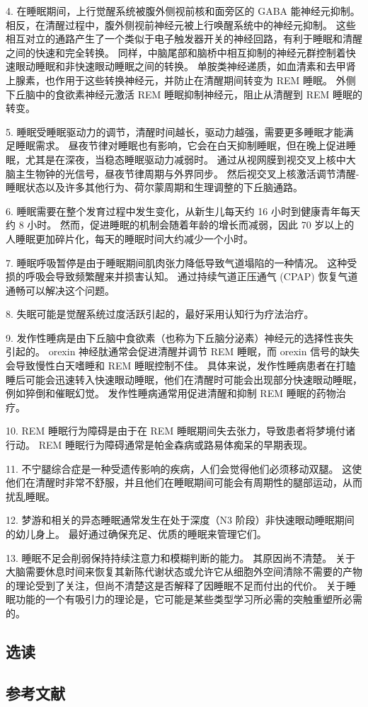 4. 在睡眠期间，上行觉醒系统被腹外侧视前核和面旁区的 GABA 能神经元抑制。 相反，在清醒过程中，腹外侧视前神经元被上行唤醒系统中的神经元抑制。 这些相互对立的通路产生了一个类似于电子触发器开关的神经回路，有利于睡眠和清醒之间的快速和完全转换。 同样，中脑尾部和脑桥中相互抑制的神经元群控制着快速眼动睡眠和非快速眼动睡眠之间的转换。 单胺类神经递质，如血清素和去甲肾上腺素，也作用于这些转换神经元，并防止在清醒期间转变为 REM 睡眠。 外侧下丘脑中的食欲素神经元激活 REM 睡眠抑制神经元，阻止从清醒到 REM 睡眠的转变。 

5. 睡眠受睡眠驱动力的调节，清醒时间越长，驱动力越强，需要更多睡眠才能满足睡眠需求。 昼夜节律对睡眠也有影响，它会在白天抑制睡眠，但在晚上促进睡眠，尤其是在深夜，当稳态睡眠驱动力减弱时。 通过从视网膜到视交叉上核中大脑主生物钟的光信号，昼夜节律周期与外界同步。 然后视交叉上核激活调节清醒-睡眠状态以及许多其他行为、荷尔蒙周期和生理调整的下丘脑通路。 

6. 睡眠需要在整个发育过程中发生变化，从新生儿每天约 16 小时到健康青年每天约 8 小时。 然而，促进睡眠的机制会随着年龄的增长而减弱，因此 70 岁以上的人睡眠更加碎片化，每天的睡眠时间大约减少一个小时。 

7. 睡眠呼吸暂停是由于睡眠期间肌肉张力降低导致气道塌陷的一种情况。 这种受损的呼吸会导致频繁醒来并损害认知。 通过持续气道正压通气 (CPAP) 恢复气道通畅可以解决这个问题。 

8. 失眠可能是觉醒系统过度活跃引起的，最好采用认知行为疗法治疗。 

9. 发作性睡病是由下丘脑中食欲素（也称为下丘脑分泌素）神经元的选择性丧失引起的。 orexin 神经肽通常会促进清醒并调节 REM 睡眠，而 orexin 信号的缺失会导致慢性白天嗜睡和 REM 睡眠控制不佳。 具体来说，发作性睡病患者在打瞌睡后可能会迅速转入快速眼动睡眠，他们在清醒时可能会出现部分快速眼动睡眠，例如猝倒和催眠幻觉。 发作性睡病通常用促进清醒和抑制 REM 睡眠的药物治疗。

10. REM 睡眠行为障碍是由于在 REM 睡眠期间失去张力，导致患者将梦境付诸行动。 REM 睡眠行为障碍通常是帕金森病或路易体痴呆的早期表现。 

11. 不宁腿综合症是一种受遗传影响的疾病，人们会觉得他们必须移动双腿。 这使他们在清醒时非常不舒服，并且他们在睡眠期间可能会有周期性的腿部运动，从而扰乱睡眠。 

12. 梦游和相关的异态睡眠通常发生在处于深度（N3 阶段）非快速眼动睡眠期间的幼儿身上。 最好通过确保充足、优质的睡眠来管理它们。 

13. 睡眠不足会削弱保持持续注意力和模糊判断的能力。 其原因尚不清楚。 关于大脑需要休息时间来恢复其新陈代谢状态或允许它从细胞外空间清除不需要的产物的理论受到了关注，但尚不清楚这是否解释了因睡眠不足而付出的代价。 关于睡眠功能的一个有吸引力的理论是，它可能是某些类型学习所必需的突触重塑所必需的。
\subsection{选读}
\subsection{参考文献}
